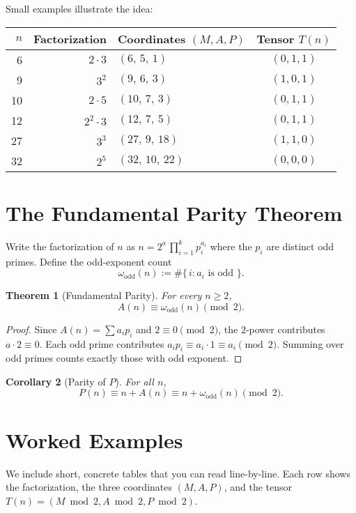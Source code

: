 \documentclass[11pt,a4paper]{article}
\numberwithin{equation}{section}
\numberwithin{figure}{section}
\numberwithin{table}{section}
\theoremstyle{plain}
\newtheorem{theorem}{Theorem}[section]
\newtheorem{corollary}[theorem]{Corollary}
\theoremstyle{definition}
\theoremstyle{remark}
\begin{document}
Small examples illustrate the idea:
\begin{center}
\begin{tabular}{r r l c}
\toprule
\(n\) & Factorization & Coordinates \((M,A,P)\) & Tensor \(T(n)\) \\
\midrule
6  & \(2\cdot 3\)   & \((6,\,5,\,1)\)  & \((0,1,1)\) \\
9  & \(3^2\)        & \((9,\,6,\,3)\)  & \((1,0,1)\) \\
10 & \(2\cdot 5\)   & \((10,\,7,\,3)\) & \((0,1,1)\) \\
12 & \(2^2\cdot 3\) & \((12,\,7,\,5)\) & \((0,1,1)\) \\
27 & \(3^3\)        & \((27,\,9,\,18)\) & \((1,1,0)\) \\
32 & \(2^5\)        & \((32,\,10,\,22)\) & \((0,0,0)\) \\
\bottomrule
\end{tabular}
\end{center}

\section{The Fundamental Parity Theorem}
Write the factorization of \(n\) as \(n=2^a\,\prod_{i=1}^k p_i^{a_i}\) where the \(p_i\) are distinct odd primes. Define the odd-exponent count
\[
\omega_{\mathrm{odd}}(n) := \#\{\,i : a_i \text{ is odd }\}.
\]

\begin{theorem}[Fundamental Parity]\label{thm:fund-parity}
For every \(n\ge 2\),
\[
A(n) \equiv \omega_{\mathrm{odd}}(n) \pmod 2.
\]
\end{theorem}
\begin{proof}
Since \(A(n)=\sum a_i p_i\) and \(2\equiv 0\pmod 2\), the \(2\)-power contributes \(a\cdot 2\equiv 0\). Each odd prime contributes \(a_i p_i\equiv a_i\cdot 1\equiv a_i\pmod 2\). Summing over odd primes counts exactly those with odd exponent.
\end{proof}

\begin{corollary}[Parity of \(P\)]
For all \(n\),
\[
P(n) \equiv n + A(n) \equiv n + \omega_{\mathrm{odd}}(n) \pmod 2.
\]
\end{corollary}

\section{Worked Examples}
We include short, concrete tables that you can read line-by-line. Each row shows the factorization, the three coordinates \((M,A,P)\), and the tensor \(T(n)=(M\bmod 2, A\bmod 2, P\bmod 2)\).
\end{document}

